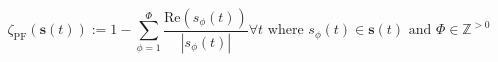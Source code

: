 \begin{equation}
	\zeta_\text{PF}(\textbf{s}(t)):= 1 - \sum_{\phi=1}^{\Phi}\frac{\text{Re}(s_\phi(t))}{|s_\phi(t)|} \forall t \text{ where } s_\phi(t) \in \textbf{s}(t) \text{ and } \Phi \in \mathbb{Z}^{>0}
\label{ch1:equ:power-factor}
\end{equation}
